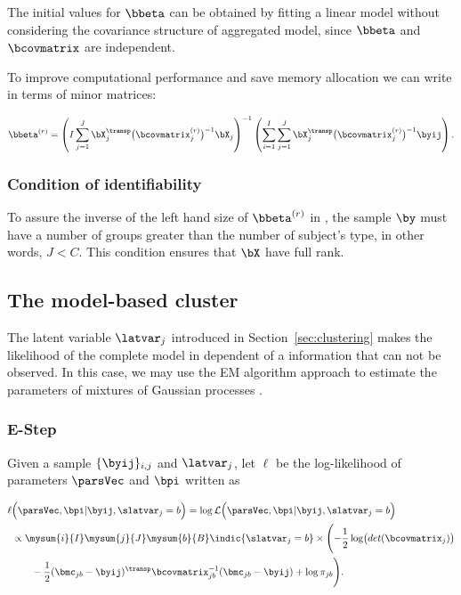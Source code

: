 The initial values for $\bbeta$ can be obtained by fitting a linear model without considering the covariance structure of aggregated model, since $\bbeta$ and $\bcovmatrix$ are independent.

To improve computational performance and save memory allocation we can write  in terms of minor matrices:

\begin{equation}
      \label{eq:betahat_opt}
      \bbeta^{(r)}
      =
      \left(
      I \sum_{j=1}^J
      \bX_j^\transp
      \bigl(\bcovmatrix_j^{(r)}\bigr)^{-1}
      \bX_j
      \right)^{-1}
      \left(
      \sum_{i=1}^I  \sum_{j=1}^J
      \bX_j^\transp
      \bigl(\bcovmatrix_j^{(r)}\bigr)^{-1}
      \byij
      \right).
    \end{equation}

\subsubsection{Condition of identifiability}
\label{sec:ident}

To assure the inverse of the left hand size of $\bbeta^{(r)}$ in , the sample $\by$ must have a number of groups greater than the number of subject's type, in other words, $J<C$. This condition ensures that $\bX$ have full rank.

\subsection{The model-based cluster}

The latent variable $\latvar_j$ introduced in Section~\ref{sec:clustering} makes the likelihood of the complete model in  dependent of a information that can not be observed. In this case, we may use the EM algorithm approach to estimate the parameters of mixtures of Gaussian processes \cite{mclachlan2007algorithm,dempster1977maximum}.

\subsubsection{E-Step}

Given a sample $\{\byij\}_{i,j}$ and $\latvar_j$, let $\ell$ be the log-likelihood of parameters $\parsVec$ and $\bpi$ written as

\begin{align}
  \ell
  &
  \Bigl(
  \parsVec, \bpi
  |
  \byij,
  \slatvar_j=b
  \Bigr)
  =
     \log \mathcal{L}
     \Bigl(
     \parsVec, \bpi
     |
     \byij, \slatvar_j =b
     \Bigr) \nonumber \\
  & 
    \propto
     \mysum{i}{I}
     \mysum{j}{J}
     \mysum{b}{B}
    \indic{\slatvar_j = b} \times %
     \Biggl(
  -\frac{1}{2} \log \bigl(det(\bcovmatrix_j) \bigr) \nonumber \\
  &\qquad
          -\frac{1}{2}
     (\bmc_{jb} - \byij)^\transp
     \bcovmatrix_{jb}^{-1}
     (\bmc_{jb} - \byij)
     + \log \pi_{jb}
    \Biggr).
    \label{eq:estep1}
\end{align}

